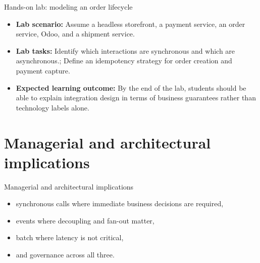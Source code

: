 \documentclass[aspectratio=169]{beamer}
\begin{document}
\begin{frame}{Hands-on lab: modeling an order lifecycle}
  \begin{itemize}
    \item \textbf{Lab scenario:} Assume a headless storefront, a payment service, an order service, Odoo, and a shipment service.
    \item \textbf{Lab tasks:} Identify which interactions are synchronous and which are asynchronous.; Define an idempotency strategy for order creation and payment capture.
    \item \textbf{Expected learning outcome:} By the end of the lab, students should be able to explain integration design in terms of business guarantees rather than technology labels alone.
  \end{itemize}
\end{frame}

\section{Managerial and architectural implications}

\begin{frame}{Managerial and architectural implications}
  \begin{itemize}
    \item synchronous calls where immediate business decisions are required,
    \item events where decoupling and fan-out matter,
    \item batch where latency is not critical,
    \item and governance across all three.
  \end{itemize}
\end{frame}
\end{document}
